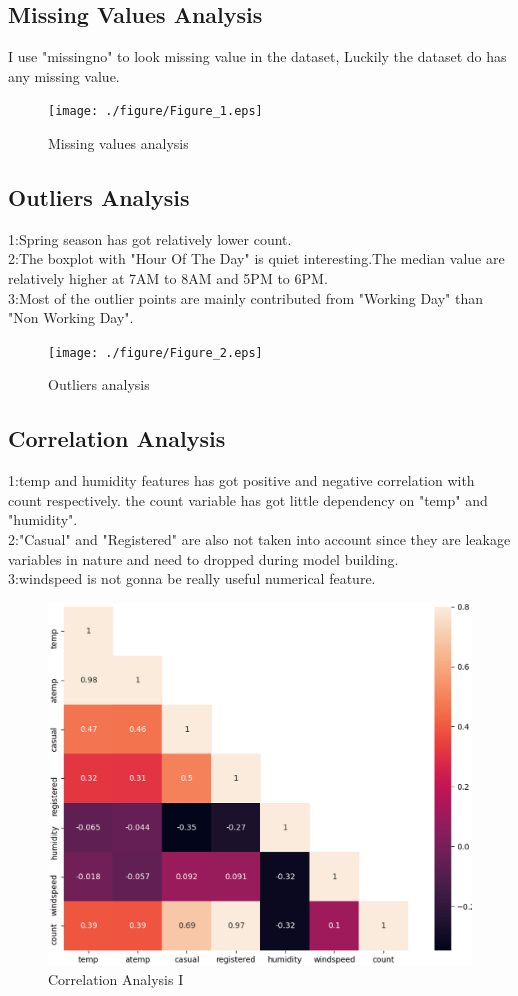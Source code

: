 \documentclass{amsart}
\begin{document}
\subsection{Missing Values Analysis}
I use "missingno" to look missing value in the dataset, Luckily the dataset do has any missing value.\\
\begin{figure}[htbp]
	\texttt{[image: ./figure/Figure\_1.eps]}
	\caption{Missing values analysis}
\end{figure}

\subsection{Outliers Analysis}
1:Spring season has got relatively lower count. \\
2:The boxplot with "Hour Of The Day" is quiet interesting.The median value are relatively higher at 7AM to 8AM and 5PM to 6PM.\\
3:Most of the outlier points are mainly contributed from "Working Day" than "Non Working Day". 
\begin{figure}[htbp]
	\texttt{[image: ./figure/Figure\_2.eps]}
	\caption{Outliers analysis}
\end{figure}

\subsection{Correlation Analysis}
1:temp and humidity features has got positive and negative correlation with count respectively. the count variable has got little dependency on "temp" and "humidity". \\
2:"Casual" and "Registered" are also not taken into account since they are leakage variables in nature and need to dropped during model building. \\
3:windspeed is not gonna be really useful numerical feature.
\begin{figure}[htbp]
	\includegraphics[scale=0.5]{./figure/Figure_3.eps}
	\caption{Correlation Analysis I}
\end{figure}
\end{document}
